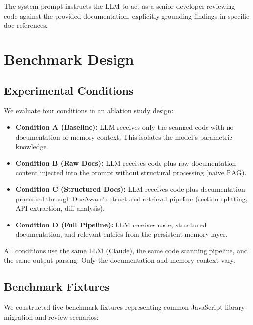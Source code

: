 \documentclass[sigconf,nonacm]{acmart}
\begin{document}
The system prompt instructs the LLM to act as a senior developer reviewing code against the provided documentation, explicitly grounding findings in specific doc references.

\section{Benchmark Design}
\label{sec:benchmark}

\subsection{Experimental Conditions}

We evaluate four conditions in an ablation study design:

\begin{itemize}
    \item \textbf{Condition A (Baseline):} LLM receives only the scanned code with no documentation or memory context. This isolates the model's parametric knowledge.
    \item \textbf{Condition B (Raw Docs):} LLM receives code plus raw documentation content injected into the prompt without structural processing (naive RAG).
    \item \textbf{Condition C (Structured Docs):} LLM receives code plus documentation processed through DocAware's structured retrieval pipeline (section splitting, API extraction, diff analysis).
    \item \textbf{Condition D (Full Pipeline):} LLM receives code, structured documentation, and relevant entries from the persistent memory layer.
\end{itemize}

All conditions use the same LLM (Claude), the same code scanning pipeline, and the same output parsing. Only the documentation and memory context vary.

\subsection{Benchmark Fixtures}

We constructed five benchmark fixtures representing common JavaScript library migration and review scenarios:
\end{document}
